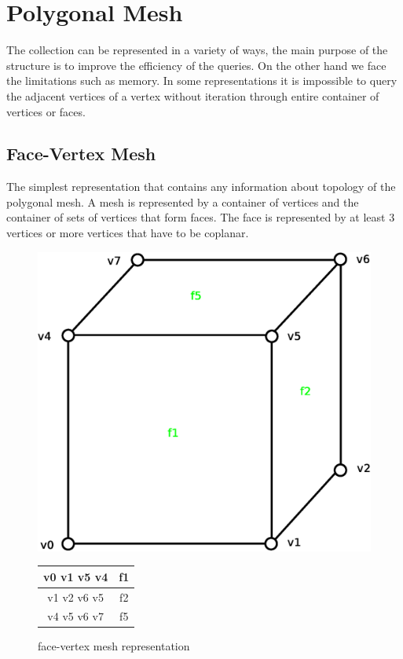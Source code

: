 \section{Polygonal Mesh}
\label{sec:polyg_mesh}
The collection can be represented in a variety of ways, the main purpose of the structure is to improve
the efficiency of the queries. On the other hand we face the limitations such as memory. In some
representations it is impossible to query the adjacent vertices of a vertex without iteration through
entire container of vertices or faces.

\subsection{Face-Vertex Mesh}
\label{sec:face-vertex}

The simplest representation that contains any information about topology of the polygonal
mesh. A mesh is represented by a container of vertices and the container of sets of vertices that
form faces\cite{Zara2004}. The face is represented by at least 3 vertices or more vertices that have to be
coplanar.\\

\begin{figure}[h]

\begin{minipage}[hb]{0.65\linewidth}
\centering
\includegraphics[width=0.6\linewidth]{../img/fv_rep_mesh.eps}
\label{fig:figure1}
\end{minipage}
\hspace{0.5cm}
\begin{minipage}[hb]{0.25\linewidth}
\centering
\begin{tabular}{|c|c|}
\hline
\textsf{v0 v1 v5 v4} & \textsf{f1}\\
\hline
\textsf{v1 v2 v6 v5} & \textsf{f2}\\
\hline
\textsf{v4 v5 v6 v7} & \textsf{f5}\\
\hline
\end{tabular}
\label{fig:fv_mesh}
\end{minipage}

\caption{face-vertex mesh representation}
\end{figure}

